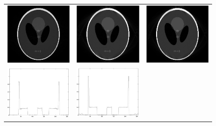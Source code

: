 \documentclass[journal]{IEEEtran}
\numberwithin{equation}{section}
\numberwithin{table}{section}
\numberwithin{figure}{section}
\begin{document}
\begin{figure}[ht!]
\centering
\begin{tabular}{ccc}
\includegraphics[width=5.5cm]{pics/phantom_2d1d_iter=1.jpg} &
\includegraphics[width=5.5cm]{pics/phantom_2d1d_iter=5.jpg}&
\includegraphics[width=5.5cm]{pics/phantom_2d1d_iter=10.jpg}\\
\includegraphics[width=5.5cm]{pics/phantom_2d1d_iter=1row.jpg} &
\includegraphics[width=5.5cm]{pics/phantom_2d1d_iter=5row.jpg} &

\end{tabular}
\end{figure}
\end{document}
